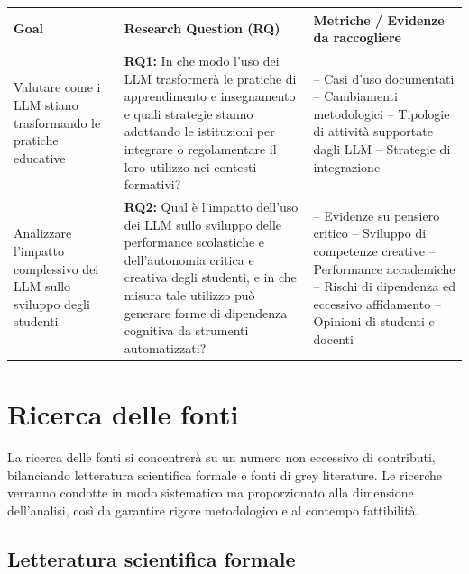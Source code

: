 \documentclass[a4paper,9pt]{article}
\begin{document}
	\begin{tabularx}{\linewidth}{|m{2cm}|m{5cm}|m{4cm}|}
		\hline
		\textbf{Goal} & \textbf{Research Question (RQ)} & \textbf{Metriche / Evidenze da raccogliere} \\
		\hline
		Valutare come i LLM stiano trasformando le pratiche educative &
		\textbf{RQ1:} In che modo l’uso dei LLM trasformerà le pratiche di apprendimento e insegnamento e quali strategie stanno adottando le istituzioni per integrare o regolamentare il loro utilizzo nei contesti formativi? &
		-- Casi d’uso documentati \newline
		-- Cambiamenti metodologici \newline
		-- Tipologie di attività supportate dagli LLM \newline
		-- Strategie di integrazione \\
		\hline
		Analizzare l’impatto complessivo dei LLM sullo sviluppo degli studenti &
		\textbf{RQ2:} Qual è l’impatto dell’uso dei LLM sullo sviluppo delle performance scolastiche e dell’autonomia critica e creativa degli studenti, e in che misura tale utilizzo può generare forme di dipendenza cognitiva da strumenti automatizzati? &
		-- Evidenze su pensiero critico \newline
		-- Sviluppo di competenze creative \newline
		-- Performance accademiche \newline
		-- Rischi di dipendenza ed eccessivo affidamento \newline
		-- Opinioni di studenti e docenti \\
		\hline
		
	\end{tabularx}
		

	
	\section{Ricerca delle fonti}
	
	La ricerca delle fonti si concentrerà su un numero non eccessivo di contributi,
	bilanciando letteratura scientifica formale e fonti di grey literature. 
	Le ricerche verranno condotte in modo sistematico ma proporzionato alla dimensione dell'analisi, così da garantire rigore metodologico e al contempo fattibilità.
	
	\subsection{Letteratura scientifica formale}
	
\end{document}
